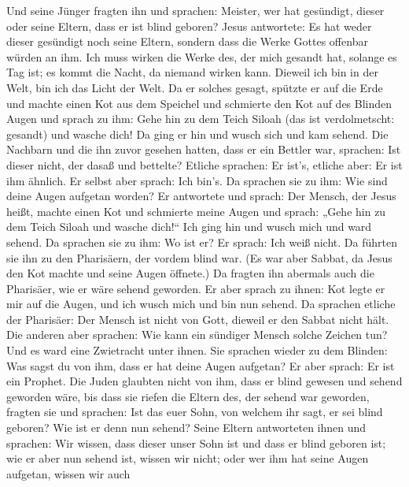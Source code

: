 Und seine Jünger fragten ihn und sprachen: Meister, wer hat gesündigt,
dieser oder seine Eltern, dass er ist blind geboren?  Jesus
antwortete: Es hat weder dieser gesündigt noch seine Eltern, sondern
dass die Werke Gottes offenbar würden an ihm.  Ich muss
wirken die Werke des, der mich gesandt hat, solange es Tag ist; es kommt
die Nacht, da niemand wirken kann.  Dieweil ich bin in der
Welt, bin ich das Licht der Welt.  Da er solches gesagt,
spützte er auf die Erde und machte einen Kot aus dem Speichel und
schmierte den Kot auf des Blinden Augen  und sprach zu ihm:
Gehe hin zu dem Teich Siloah (das ist verdolmetscht: gesandt) und wasche
dich! Da ging er hin und wusch sich und kam sehend.  Die
Nachbarn und die ihn zuvor gesehen hatten, dass er ein Bettler war,
sprachen: Ist dieser nicht, der dasaß und bettelte?  Etliche
sprachen: Er ist's, etliche aber: Er ist ihm ähnlich. Er selbst aber
sprach: Ich bin's.  Da sprachen sie zu ihm: Wie sind deine
Augen aufgetan worden?  Er antwortete und sprach: Der
Mensch, der Jesus heißt, machte einen Kot und schmierte meine Augen und
sprach: „Gehe hin zu dem Teich Siloah und wasche dich!{}`` Ich ging hin
und wusch mich und ward sehend.  Da sprachen sie zu ihm: Wo
ist er? Er sprach: Ich weiß nicht.  Da führten sie ihn zu
den Pharisäern, der vordem blind war.  (Es war aber Sabbat,
da Jesus den Kot machte und seine Augen öffnete.)  Da
fragten ihn abermals auch die Pharisäer, wie er wäre sehend geworden. Er
aber sprach zu ihnen: Kot legte er mir auf die Augen, und ich wusch mich
und bin nun sehend.  Da sprachen etliche der Pharisäer: Der
Mensch ist nicht von Gott, dieweil er den Sabbat nicht hält. Die anderen
aber sprachen: Wie kann ein sündiger Mensch solche Zeichen tun? Und es
ward eine Zwietracht unter ihnen.  Sie sprachen wieder zu
dem Blinden: Was sagst du von ihm, dass er hat deine Augen aufgetan? Er
aber sprach: Er ist ein Prophet.  Die Juden glaubten nicht
von ihm, dass er blind gewesen und sehend geworden wäre, bis dass sie
riefen die Eltern des, der sehend war geworden,  fragten
sie und sprachen: Ist das euer Sohn, von welchem ihr sagt, er sei blind
geboren? Wie ist er denn nun sehend?  Seine Eltern
antworteten ihnen und sprachen: Wir wissen, dass dieser unser Sohn ist
und dass er blind geboren ist;  wie er aber nun sehend ist,
wissen wir nicht; oder wer ihm hat seine Augen aufgetan, wissen wir auch
